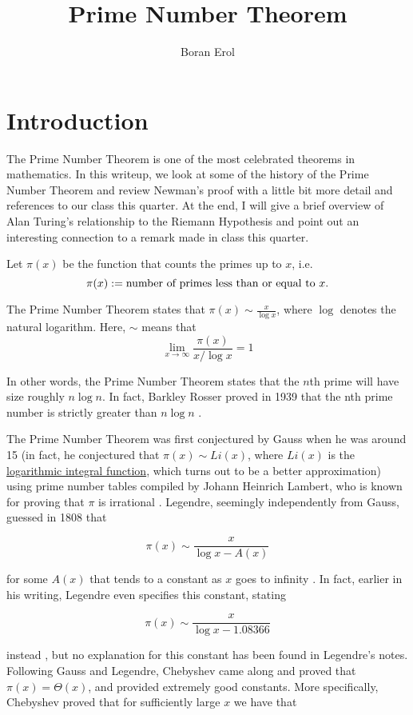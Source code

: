 \documentclass{article}
\title{Prime Number Theorem}
\author{Boran Erol}
\theoremstyle{definition}
\begin{document}
\maketitle

\section{Introduction}

The Prime Number Theorem is one of the most celebrated theorems in mathematics. In this writeup,
we look at some of the history of the Prime Number Theorem and review Newman's proof with a little bit 
more detail and references to our class this quarter. At the end,
I will give a brief overview of Alan Turing's relationship to the Riemann Hypothesis
and point out an interesting connection to a remark made in class this quarter.

Let $ \pi(x) $ be the function that counts the primes up to $ x $, i.e.\[ \pi(x) := \text{number of primes less than or equal to $ x $} .\]

The Prime Number Theorem states that $ \pi(x) \sim \frac{x}{\log x} $, where $\log $ denotes the natural logarithm.
Here, $ \sim $ means that \[ \lim_{x \to \infty} \frac{ \pi(x)}{x/ \log{x}} = 1 \]

In other words, the Prime Number Theorem states that the $n$th prime will have size roughly $ n \log n $.
In fact, Barkley Rosser proved in 1939 that the nth prime number is strictly greater than $ n \log n $ \cite{rosser_n-th_1939}.

The Prime Number Theorem was first conjectured by Gauss when he was around 15 (in fact, 
he conjectured that $ \pi(x) \sim Li(x) $, where $ Li(x) $ is the \href{https://en.wikipedia.org/wiki/Logarithmic_integral_function}{logarithmic integral function}, which turns out to be a better approximation) 
using prime number tables compiled by Johann Heinrich Lambert, who is
known for proving that $ \pi $ is irrational \cite{klyve_origin_2018} \cite{noauthor_histoire_nodate}. Legendre, seemingly independently from Gauss,
guessed in 1808 that

\[ \pi(x) \sim \frac{x}{\log x - A(x)} \]

for some $ A(x) $ that tends to a constant as $ x $ goes to infinity \cite{bateman_hundred_1996}. In fact,
earlier in his writing, Legendre even specifies this constant, stating 

\[ \pi(x) \sim \frac{x}{\log x - 1.08366} \]

instead \cite{bambah_centennial_2000}, but no explanation for this constant has been found in Legendre's notes.
Following Gauss and Legendre, Chebyshev came along and proved that $ \pi(x) = \Theta(x) $,
and provided extremely good constants. More specifically, Chebyshev \cite{bateman_hundred_1996} proved that for 
sufficiently large $ x $ we have that
\end{document}
